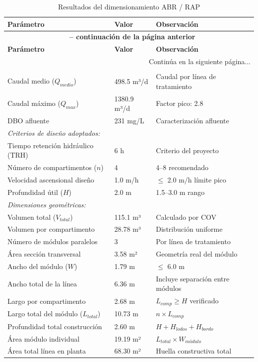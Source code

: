 \documentclass[12pt,a4paper]{article}
\begin{document}
\begin{longtable}{p{6cm}p{3cm}p{5cm}}
\caption{Resultados del dimensionamiento ABR / RAP} \\
\toprule
\textbf{Parámetro} & \textbf{Valor} & \textbf{Observación} \\
\midrule
\endfirsthead
\multicolumn{3}{c}{
    {\bfseries \tablename\ \thetable{} -- continuación de la página anterior}
} \\
\toprule
\textbf{Parámetro} & \textbf{Valor} & \textbf{Observación} \\
\midrule
\endhead
\midrule
\multicolumn{3}{r}{Continúa en la siguiente página...} \\
\endfoot
\bottomrule
\endlastfoot

\multicolumn{3}{l}{\textit{Parámetros de entrada:}} \\
Caudal medio ($Q_{medio}$) & 498.5 m³/d & Caudal por línea de tratamiento \\
Caudal máximo ($Q_{max}$) & 1380.9 m³/d & Factor pico: 2.8 \\
DBO afluente & 231 mg/L & Caracterización afluente \\
\midrule

\multicolumn{3}{l}{\textit{Criterios de diseño adoptados:}} \\
Tiempo retención hidráulico (TRH) & 6 h & Criterio del proyecto \\
Número de compartimentos ($n$) & 4 & 4--8 recomendado \\
Velocidad ascensional diseño & 1.0 m/h & $\leq$ 2.0 m/h límite pico \\
Profundidad útil ($H$) & 2.0 m & 1.5--3.0 m rango \\
\midrule

\multicolumn{3}{l}{\textit{Dimensiones geométricas:}} \\
Volumen total ($V_{total}$) & 115.1 m³ & Calculado por COV \\
Volumen por compartimento & 28.78 m³ & Distribución uniforme \\
Número de módulos paralelos & 3 & Por línea de tratamiento \\
Área sección transversal & 3.58 m² & Geometría real del módulo \\
Ancho del módulo ($W$) & 1.79 m & $\leq$ 6.0 m \\
Ancho total de la línea & 6.36 m & Incluye separación entre módulos \\
Largo por compartimento & 2.68 m & $L_{comp} \geq H$ verificado \\
Largo total del módulo ($L_{total}$) & 10.73 m & $n \times L_{comp}$ \\
Profundidad total construcción & 2.60 m & $H + H_{lodos} + H_{bordo}$ \\
Área módulo individual & 19.19 m² & $L_{total} \times W_{módulo}$ \\
Área total línea en planta & 68.30 m² & Huella constructiva total \\
\midrule


\end{longtable}
\end{document}
